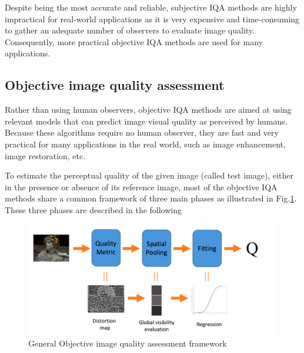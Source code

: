 Despite being the most accurate and reliable, subjective IQA methods are highly impractical for real-world applications as it is very expensive and time-consuming to gather an adequate number of observers to evaluate image quality. Consequently, more practical objective IQA methods are used for many applications.

\subsection{Objective image quality assessment}

Rather than using human observers, objective IQA methods are aimed at using relevant models that can predict image visual quality as perceived by humans. Because these algorithms require no human observer, they are fast and very practical for many applications in the real world, such as image enhancement, image restoration, etc.

To estimate the perceptual quality of the given image (called test image), either in the presence or absence of its reference image, most of the objective IQA methods share a common framework of three main phases as illustrated in Fig.\ref{fig:obj-fw}. These
three phases are described in the following

\begin{figure}[H]
  \includegraphics[width=\linewidth]{figures/objective-framework.png}
  \caption{General Objective image quality assessment framework}
  \label{fig:obj-fw}
\end{figure}

